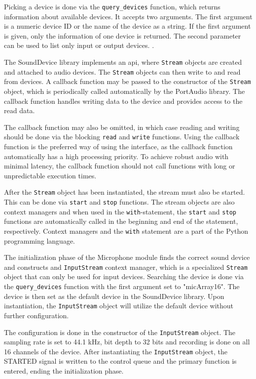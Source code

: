 Picking a device is done via the \texttt{query\_devices} function,
which returns information about available devices.
It accepts two arguments.
The first argument is a numeric device ID or the name of the device as a string.
If the first argument is given, only the information of one device is returned.
The second parameter can be used to list only input or output devices. \cite{sounddevice-docs}.

The SoundDevice library implements an \gls{api}, where \texttt{Stream} objects are created and attached to audio devices.
The \texttt{Stream} objects can then write to and read from devices.
A callback function may be passed to the constructor of the \texttt{Stream} object,
which is periodically called automatically by the PortAudio library.
The callback function handles writing data to the device and provides access to the read data. \cite{sounddevice-docs-stream}

The callback function may also be omitted,
in which case reading and writing should be done via the blocking \texttt{read} and \texttt{write} functions.
Using the callback function is the preferred way of using the interface,
as the callback function automatically has a high processing priority.
To achieve robust audio with minimal latency, 
the callback function should not call functions with long or unpredictable execution times. \cite{sounddevice-docs-stream}

After the \texttt{Stream} object has been instantiated,
the stream must also be started.
This can be done via \texttt{start} and \texttt{stop} functions.
The stream objects are also context managers and when used in the \texttt{with}-statement,
the \texttt{start} and \texttt{stop} functions are automatically called in the beginning and end of the statement, respectively. \cite{sounddevice-docs-stream}
Context managers and the \texttt{with} statement are a part of the Python programming language.

The initialization phase of the Microphone module finds the correct sound device and constructs and \texttt{InputStream} context manager,
which is a specialized \texttt{Stream} object that can only be used for input devices.
Searching the device is done via the \texttt{query\_devices} function with the first argument set to "micArray16".
The device is then set as the default device in the SoundDevice library.
Upon instantiation, the \texttt{InputStream} object will utilize the default device without further configuration.

The configuration is done in the constructor of the \texttt{InputStream} object.
The sampling rate is set to 44.1 kHz, bit depth to 32 bits and recording is done on all 16 channels of the device.
After instantiating the \texttt{InputStream} object, the STARTED signal is written to the control queue and the primary function is entered, ending the initialization phase.

